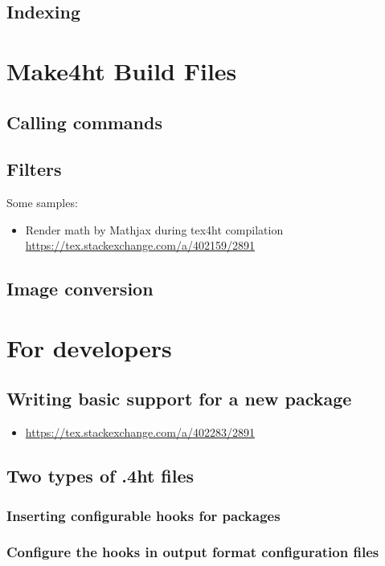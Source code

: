 \documentclass{book}
\begin{document}
\section{Indexing}

\chapter{Make4ht Build Files}
\section{Calling commands}
\section{Filters}

Some samples:

\begin{itemize}
  \item Render math by Mathjax during tex4ht compilation \url{https://tex.stackexchange.com/a/402159/2891}
\end{itemize}
\section{Image conversion}

\chapter{For developers}

\section{Writing basic support for a new package}
\begin{itemize}
  \item \url{https://tex.stackexchange.com/a/402283/2891}
\end{itemize}

\section{Two types of .4ht files}

\subsection{Inserting configurable hooks for packages}

\subsection{Configure the hooks in output format configuration files}
\end{document}
